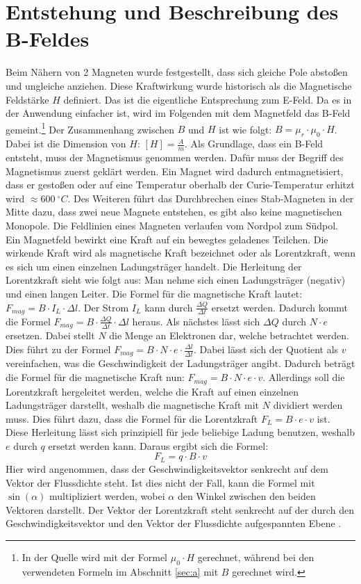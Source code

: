 \section{Entstehung und Beschreibung des B-Feldes}
Beim Nähern von 2 Magneten wurde festgestellt, dass sich gleiche Pole abstoßen und ungleiche anziehen.
Diese Kraftwirkung wurde historisch als die Magnetische Feldstärke $H$ definiert.
Das ist die eigentliche Entsprechung zum E-Feld.
Da es in der Anwendung einfacher ist, wird im Folgenden mit dem Magnetfeld das B-Feld gemeint.\footnote{In der Quelle \cite{Gente1950} wird mit der Formel $\mu_0 \cdot H$ gerechnet, während bei den verwendeten Formeln im Abschnitt \ref{sec:a} mit $B$ gerechnet wird.}
Der Zusammenhang zwischen $B$ und $H$ ist wie folgt: $B = \mu_r \cdot \mu_0 \cdot H$.
Dabei ist die Dimension von $H$: $[H] = \frac{A}{m}$.
Als Grundlage, dass ein B-Feld entsteht, muss der Magnetismus genommen werden.
Dafür muss der Begriff des Magnetismus zuerst geklärt werden.
Ein Magnet wird dadurch entmagnetisiert, dass er gestoßen oder auf eine Temperatur oberhalb der Curie-Temperatur erhitzt wird $ \approx 600 ~ ^\circ C$.
Des Weiteren führt das Durchbrechen eines Stab-Magneten in der Mitte dazu, dass zwei neue Magnete entstehen, es gibt also keine magnetischen Monopole.
Die Feldlinien eines Magneten verlaufen vom Nordpol zum Südpol.
Ein Magnetfeld bewirkt eine Kraft auf ein bewegtes geladenes Teilchen.
Die wirkende Kraft wird als magnetische Kraft bezeichnet oder als Lorentzkraft, wenn es sich um einen einzelnen Ladungsträger handelt.
Die Herleitung der Lorentzkraft sieht wie folgt aus:
Man nehme sich einen Ladungsträger (negativ) und einen langen Leiter.
Die Formel für die magnetische Kraft lautet: $F_{mag} =  B \cdot I_L \cdot \Delta l$.
Der Strom $I_L$ kann durch $\frac{\Delta Q}{\Delta t}$ ersetzt werden.
Dadurch kommt die Formel $F_{mag} = B \cdot \frac{\Delta Q}{\Delta t} \cdot \Delta l$ heraus.
Als nächstes lässt sich $\Delta Q$ durch $N \cdot e$ ersetzen.
Dabei stellt $N$ die Menge an Elektronen dar, welche betrachtet werden.
Dies führt zu der Formel $F_{mag} = B \cdot N \cdot e \cdot \frac{\Delta l}{\Delta t}$.
Dabei lässt sich der Quotient als $v$ vereinfachen, was die Geschwindigkeit der Ladungsträger angibt.
Dadurch beträgt die Formel für die magnetische Kraft nun: $F_{mag} = B \cdot N \cdot e \cdot v$.
Allerdings soll die Lorentzkraft hergeleitet werden, welche die Kraft auf einen einzelnen Ladungsträger darstellt, weshalb die magnetische Kraft mit $N$ dividiert werden muss.
Dies führt dazu, dass die Formel für die Lorentzkraft $F_L = B \cdot e \cdot v$ ist.
Diese Herleitung lässt sich prinzipiell für jede beliebige Ladung benutzen, weshalb $e$ durch $q$ ersetzt werden kann.
Daraus ergibt sich die Formel:
\begin{equation*}
    F_L = q \cdot B \cdot v
\end{equation*}
Hier wird angenommen, dass der Geschwindigkeitsvektor senkrecht auf dem Vektor der Flussdichte steht.
Ist dies nicht der Fall, kann die Formel mit $\sin(\alpha)$ multipliziert werden, wobei $\alpha$ den Winkel zwischen den beiden Vektoren darstellt.
Der Vektor der Lorentzkraft steht senkrecht auf der durch den Geschwindigkeitsvektor und den Vektor der Flussdichte aufgespannten Ebene \cite{Lorentzkraft}.

